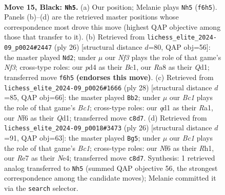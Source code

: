 \documentclass[11pt]{article}
\begin{document}
\begin{figure}[p]\centering
\begin{subfigure}{0.46\textwidth}\centering
\resizebox{\linewidth}{!}{%
\newchessgame
\chessboard[
  setfen={rnb1q1k1/pp2r1pp/2p1pn2/4Np2/2PP4/2B1P1P1/P4PBP/1R1QR1K1 b - - 0 15},
  showmover=false,
  pgfstyle=straightmove, color=movearrow, markmove={f6-h5}
]}
\caption{}
\end{subfigure}\hfill
\begin{subfigure}{0.46\textwidth}\centering
\resizebox{\linewidth}{!}{%
\newchessgame
\chessboard[
  setfen={r2q1rk1/3nppbp/3p2p1/1NpP4/P3n3/R3PN2/1P3PPP/2BQR1K1 w - - 3 14},
  showmover=false,
  pgfstyle=straightmove, color=movearrow, markmove={f3-d2}
]}
\caption{}
\end{subfigure}
\\[4pt]
\begin{subfigure}{0.46\textwidth}\centering
\resizebox{\linewidth}{!}{%
\newchessgame
\chessboard[
  setfen={rnbq1rk1/pp2ppbp/2p3p1/2N1P3/3P4/1PN1P3/P4RPP/R1BQ2K1 w - - 3 15},
  showmover=false,
  pgfstyle=straightmove, color=movearrow, markmove={c1-b2}
]}
\caption{}
\end{subfigure}\hfill
\begin{subfigure}{0.46\textwidth}\centering
\resizebox{\linewidth}{!}{%
\newchessgame
\chessboard[
  setfen={r2qkb1r/p4pp1/1np1p3/4Pn1p/1p1PN2P/5N2/PP3PP1/R1BQK2R w KQkq - 0 14},
  showmover=false,
  pgfstyle=straightmove, color=movearrow, markmove={c1-g5}
]}
\caption{}
\end{subfigure}
\caption{\textbf{Move 15, Black: \texttt{Nh5}.} (a) Our position; Melanie plays \texttt{Nh5} (\texttt{f6h5}). Panels (b)--(d) are the retrieved master positions whose correspondence most drove this move (highest QAP objective among those that transfer to it). (b) Retrieved from \texttt{lichess\_elite\_2024-09\_p0024\#2447} (ply 26) [structural distance $d$=80, QAP obj=56]: the master played \texttt{Nd2}; under $\mu$ our \emph{Nf3} plays the role of that game's \emph{Nf3}; cross-type roles: our \emph{p}d4 as their \emph{B}c1, our \emph{R}a8 as their \emph{Q}d1; transferred move \texttt{f6h5} \textbf{(endorses this move)}. (c) Retrieved from \texttt{lichess\_elite\_2024-09\_p0026\#1666} (ply 28) [structural distance $d$=85, QAP obj=66]: the master played \texttt{Bb2}; under $\mu$ our \emph{Bc1} plays the role of that game's \emph{Bc1}; cross-type roles: our \emph{q}d1 as their \emph{R}a1, our \emph{N}f6 as their \emph{Q}d1; transferred move \texttt{c8d7}. (d) Retrieved from \texttt{lichess\_elite\_2024-09\_p0018\#3473} (ply 26) [structural distance $d$=91, QAP obj=63]: the master played \texttt{Bg5}; under $\mu$ our \emph{Bc1} plays the role of that game's \emph{Bc1}; cross-type roles: our \emph{N}f6 as their \emph{R}h1, our \emph{R}e7 as their \emph{N}e4; transferred move \texttt{c8d7}. Synthesis: 1 retrieved analog transferred to \texttt{Nh5} (summed QAP objective 56, the strongest correspondence among the candidate moves); Melanie committed it via the \texttt{search} selector.}
\label{fig:thought-m29}
\end{figure}
\end{document}
